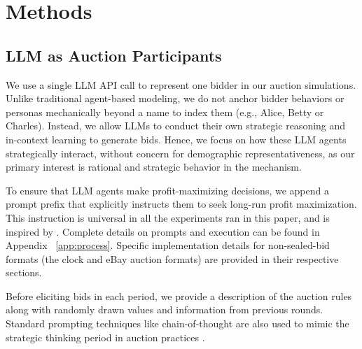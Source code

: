 \documentclass{article} %
\begin{document}
\section{Methods}

\subsection{LLM as Auction Participants}

We use a single LLM API call to represent one bidder in our auction simulations. Unlike traditional agent-based modeling, we do not anchor bidder behaviors or personas mechanically beyond a name to index them (e.g., Alice, Betty or Charles). Instead, we allow LLMs to conduct their own strategic reasoning and in-context learning to generate bids. Hence, we focus on how these LLM agents strategically interact, without concern for demographic representativeness, as our primary interest is rational and strategic behavior in the mechanism.

To ensure that LLM agents make profit-maximizing decisions, we append a prompt prefix that explicitly instructs them to seek long-run profit maximization. This instruction is universal in all the experiments ran in this paper, and is inspired by \citep{fish2024algorithmic, chen2023put}. 
Complete details on prompts and execution can be found in Appendix ~\ref{app:process}. Specific implementation details for non-sealed-bid formats (the clock and eBay auction formats) are provided in their respective sections.

Before eliciting bids in each period, we provide a description of the auction rules along with randomly drawn values and information from previous rounds. Standard prompting techniques like chain-of-thought \citep{wei2022chain} are also used to mimic the strategic thinking period in auction practices \citep{li2017obviously}.

\end{document}
